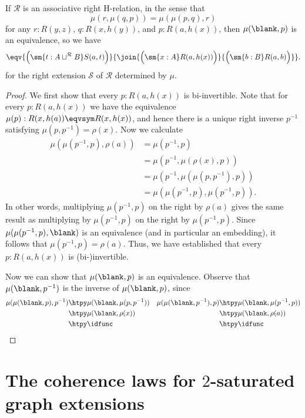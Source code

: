 \begin{cor}
If $\mathcal{R}$ is an associative right H-relation, in the sense that
\begin{equation*}
\mu(r,\mu(q,p))=\mu(\mu(p,q),r)
\end{equation*}
for any $r:R(y,z)$, $q:R(x,h(y))$, and $p:R(a,h(x))$, then $\mu(\blank,p)$ is an equivalence, so we have
\begin{equation*}
\eqv{\Big(\sm{t:A\sqcup^{\mathcal{R}} B}S(a,t)\Big)}{\join{\Big(\sm{x:A}R(a,h(x))\Big)}{\Big(\sm{b:B}R(a,b)\Big)}}.
\end{equation*}
for the right extension $\mathcal{S}$ of $\mathcal{R}$ determined by $\mu$.
\end{cor}

\begin{proof}
We first show that every $p:R(a,h(x))$ is bi-invertible. Note that for every $p:R(a,h(x))$ we have the equivalence $\mu(p):R(x,h(a))\eqvsym R(x,h(x))$, and hence there is a unique right inverse $p^{-1}$ satisfying $\mu(p,p^{-1})=\rho(x)$. Now we calculate
\begin{align*}
\mu(\mu(p^{-1},p),\rho(a)) & = \mu(p^{-1},p) \\
& = \mu(p^{-1},\mu(\rho(x),p)) \\
& = \mu(p^{-1},\mu(\mu(p,p^{-1}),p)) \\
& = \mu(\mu(p^{-1},p),\mu(p^{-1},p)).
\end{align*}
In other words, multiplying $\mu(p^{-1},p)$ on the right by $\rho(a)$ gives the same result as multiplying by $\mu(p^{-1},p)$ on the right by $\mu(p^{-1},p)$. Since $\mu(\mu(p^{-1},p),\blank)$ is an equivalence (and in particular an embedding), it follows that $\mu(p^{-1},p)=\rho(a)$. Thus, we have established that every $p:R(a,h(x))$ is (bi-)invertible. 

Now we can show that $\mu(\blank,p)$ is an equivalence. Observe that $\mu(\blank,p^{-1})$ is the inverse of $\mu(\blank,p)$, since
\begin{align*}
\mu(\mu(\blank,p),p^{-1}) & \htpy \mu(\blank,\mu(p,p^{-1})) & \mu(\mu(\blank,p^{-1}),p) & \htpy \mu(\blank,\mu(p^{-1},p)) \\
& \htpy \mu(\blank,\rho(x)) & & \htpy \mu(\blank,\rho(a)) \\
& \htpy \idfunc & & \htpy \idfunc \qedhere
\end{align*}
\end{proof}

\section{The coherence laws for \texorpdfstring{$2$}{2}-saturated graph extensions}

